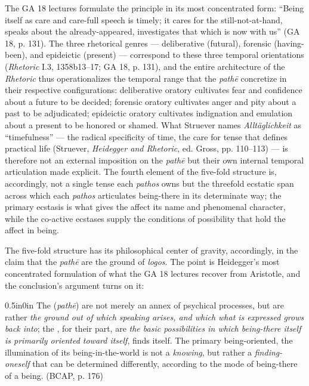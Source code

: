 The GA 18 lectures formulate the principle in its most concentrated form: ``Being itself as care and care-full speech is timely; it cares for the still-not-at-hand, speaks about the already-appeared, investigates that which is now with us'' (GA 18, p. 131). The three rhetorical genres --- deliberative (futural), forensic (having-been), and epideictic (present) --- correspond to these three temporal orientations (\textit{Rhetoric} I.3, 1358b13--17; GA 18, p. 131), and the entire architecture of the \textit{Rhetoric} thus operationalizes the temporal range that the \textit{pathē} concretize in their respective configurations: deliberative oratory cultivates fear and confidence about a future to be decided; forensic oratory cultivates anger and pity about a past to be adjudicated; epideictic oratory cultivates indignation and emulation about a present to be honored or shamed. What Struever names \textit{Alltäglichkeit} as ``timefulness'' --- the radical specificity of time, the care for tense that defines practical life (Struever, \textit{Heidegger and Rhetoric}, ed. Gross, pp. 110--113) --- is therefore not an external imposition on the \textit{pathē} but their own internal temporal articulation made explicit. The fourth element of the five-fold structure is, accordingly, not a single tense each \textit{pathos} owns but the threefold ecstatic span across which each \textit{pathos} articulates being-there in its determinate way; the primary ecstasis is what gives the affect its name and phenomenal character, while the co-active ecstases supply the conditions of possibility that hold the affect in being.

The five-fold structure has its philosophical center of gravity, accordingly, in the claim that the \textit{pathē} are the ground of \textit{logos}. The point is Heidegger's most concentrated formulation of what the GA 18 lectures recover from Aristotle, and the conclusion's argument turns on it:

\begin{adjustwidth}{0.5in}{0in}
The  (\textit{pathē}) are not merely an annex of psychical processes, but are rather \textit{the ground out of which speaking arises, and which what is expressed grows back into}; the , for their part, are \textit{the basic possibilities in which being-there itself is primarily oriented toward itself}, finds itself. The primary being-oriented, the illumination of its being-in-the-world is not a \textit{knowing}, but rather a \textit{finding-oneself} that can be determined differently, according to the mode of being-there of a being. (BCAP, p. 176)
\end{adjustwidth}

